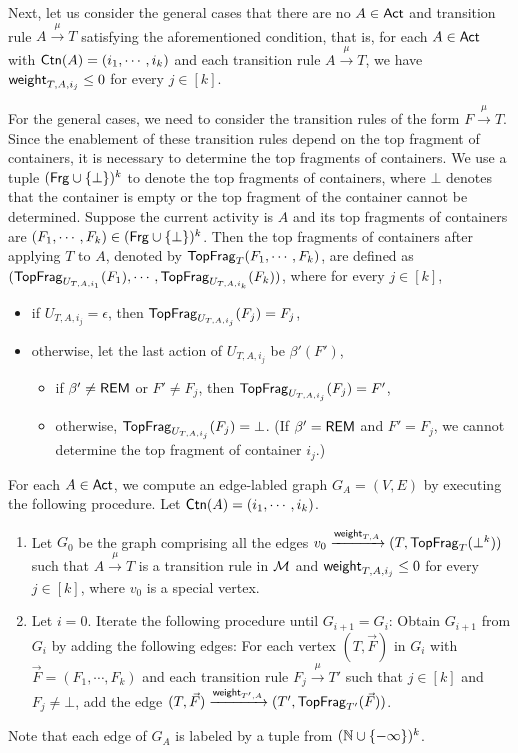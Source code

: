 Next, let us consider the general cases that there are no $A \in {\sf Act}$ and transition rule $A \xrightarrow{\mu} T$ satisfying the aforementioned condition, that is, for each $A \in {\sf Act}$ with ${\sf Ctn}(A) = (i_1, \cdots, i_k)$ and each transition rule $A \xrightarrow{\mu} T$, we have ${\mathsf{weight} }_{T, A, i_j} \le 0$ for every $j \in [k]$. 

For the general cases, we need to consider the transition rules of the form $F \xrightarrow{\mu} T$.
Since the enablement of these transition rules depend on the top fragment of containers, it is necessary to determine the top fragments of containers. 
We use a tuple $({\sf Frg} \cup \{\bot\})^k$ to denote the top fragments of containers, where $\bot$ denotes that the container is empty or the top fragment of the container cannot be determined. 
Suppose the current activity is $A$ and its top fragments of containers are $(F_1, \cdots, F_k)  \in ({\sf Frg} \cup \{\bot\})^k$. Then the top fragments of containers after applying $T$ to $A$, denoted by $\mathsf{TopFrag}_T(F_1, \cdots, F_k)$, are defined as $(\mathsf{TopFrag}_{U_{T, A, i_1}}(F_1), \cdots, \mathsf{TopFrag}_{U_{T, A, i_k}}(F_k))$, where for every $j \in [k]$,
\begin{itemize}
\item if $U_{T, A, i_j} = \epsilon$, then $\mathsf{TopFrag}_{U_{T, A, i_j}}(F_j)  = F_j$, 
%
\item otherwise, let the last action of $U_{T, A, i_j}$ be $\beta'(F')$,
\begin{itemize}
\item if $\beta' \neq \mathsf{REM}$ or $F' \neq F_j$, then $\mathsf{TopFrag}_{U_{T, A, i_j}}(F_j) = F'$, 
%
\item otherwise, $\mathsf{TopFrag}_{U_{T, A, i_j}}(F_j) = \bot$. (If $\beta' = \mathsf{REM}$ and $F' = F_j$, we cannot determine the top fragment of container $i_j$.)
\end{itemize}
\end{itemize}


For each $A \in {\sf Act}$, we compute an edge-labled graph $G_A = (V, E)$ by executing the following procedure.  Let ${\sf Ctn}(A) = (i_1, \cdots, i_k)$.
\begin{enumerate}
\item Let $G_0$ be the graph comprising all the edges $v_0 \xrightarrow{{\mathsf{weight} }_{T, A}} (T, \mathsf{TopFrag}_{T}(\bot^k))$ such that $A \xrightarrow{\mu} T$ is a transition rule in ${\mathcal{M} }$ and ${\mathsf{weight} }_{T, A, i_j} \le 0$ for every $j \in [k]$, where $v_0$ is a special vertex.
%
\item  Let $i = 0$. Iterate the following procedure until $G_{i+1} = G_i$: Obtain $G_{i+1}$ from $G_i$ by adding the following edges: 
For each vertex $(T, \vec{F})$ in $G_i$ with $\vec{F} = (F_1, \cdots, F_k)$ and each transition rule $F_j \xrightarrow{\mu} T'$ such that 
$j \in [k]$ and $F_j \neq \bot$, add the edge $(T, \vec{F}) \xrightarrow{{\mathsf{weight} }_{T', A}} (T', \mathsf{TopFrag}_{T'}(\vec{F}))$.
%
\end{enumerate}
Note that each edge of $G_A$ is labeled by a tuple from $({\mathbb{N} } \cup \{-\infty\})^k$.

